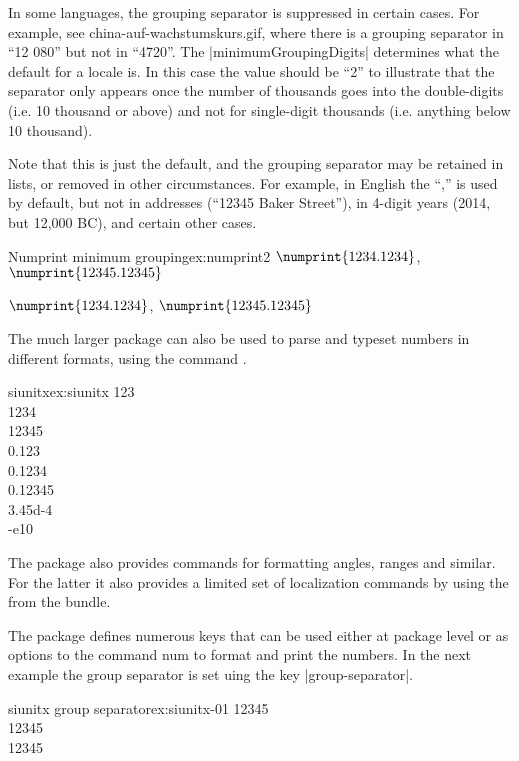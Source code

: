 In some languages, the grouping separator is suppressed in certain cases. For example, see china-auf-wachstumskurs.gif, where there is a grouping separator in \enquote{12 080} but not in \enquote{4720}. The |minimumGroupingDigits| determines what the default for a locale is. In this case the value should be \enquote{2} to illustrate that the separator only appears once the number of thousands goes into the double-digits (i.e. 10 thousand or above) and not for single-digit thousands (i.e. anything below 10 thousand).


Note that this is just the default, and the grouping separator may be retained in lists, or removed in other circumstances. For example, in English the \enquote{,} is used by default, but not in addresses (\enquote{12345 Baker Street}), in 4-digit years (2014, but 12,000 BC), and certain other cases.

\begin{texexample}{Numprint minimum grouping}{ex:numprint2}
\begingroup
\npfourdigitnosep$\numprint{1234.1234}$, $\numprint{12345.12345}$ 

\npfourdigitsep$\numprint{1234.1234}$, $\numprint{12345.12345}$
\endgroup
\end{texexample}

The much larger package  can also be used to parse and typeset numbers in different formats, using the command .


\begin{texexample}{siunitx}{ex:siunitx}
\num{123}\\
\num{1234}\\
\num{12 345}\\
\num{0.123} \\
\num{0,1234}\\
\num{.12345}\\
\num{3.45d-4}\\
\num{-e10}
\end{texexample}

The package also provides commands for formatting angles, ranges and similar. For the latter it also provides a limited set of localization commands by using the  from the  bundle.

The package defines numerous keys that can be used either at package level or as options to the command num to format and print the numbers. In the next example the group separator is set uing the key |group-separator|. 

\begin{texexample}{siunitx group separator}{ex:siunitx-01}
\num{12345} \\
\num[group-separator = {,}]{12345} \\
\num[group-separator = \text{~}]{12345}
\end{texexample}


